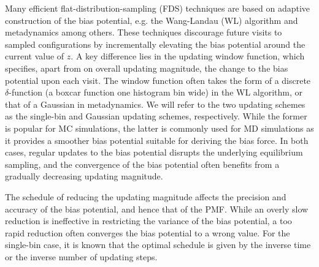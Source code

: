 \documentclass[preprint, superscriptaddress, floatfix]{revtex4-1}
\begin{document}
Many efficient flat-distribution-sampling (FDS) techniques
are based on adaptive construction of the bias potential,
e.g. the Wang-Landau (WL) algorithm\cite{
  wang2001, wang2001pre}
and metadynamics\cite{huber1994,
  *laio2002, *laio2008, *barducci2011, *sutto2012, micheletti2004}
among others\cite{yan2004, kim2006, *kim2007, kim2010, junghans2014,
  langfeld2012, pellegrini2014,
  maragliano2006, *abrams2008,
  zheng2010}.
%
These techniques
discourage future visits to sampled configurations
by incrementally elevating the bias potential
around the current value of $z$.
%
A key difference lies
in the updating window function,
which specifies,
apart from on overall updating magnitude,
the change to the bias potential upon each visit.
%
The window function often
takes the form of a discrete
$\delta$-function (a boxcar function one histogram bin wide)
in the WL algorithm,
or that of a Gaussian
in metadynamics.\cite{junghans2014}
%
We will refer to the two updating schemes
as the single-bin
and Gaussian updating schemes, respectively.
%
While the former is popular for MC simulations,\cite{wang2001,
  wang2001pre, kim2006, *kim2007}
the latter is commonly used for MD simulations
as it provides a smoother bias potential
suitable for deriving the bias force.\cite{huber1994,
  *laio2002, *laio2008, *barducci2011, *sutto2012, junghans2014}
%
In both cases,
regular updates to the bias potential
disrupts the underlying equilibrium
sampling,\cite{zhou2005, morozov2007, zhou2008}
and the convergence of the bias potential
often benefits from a gradually decreasing
updating magnitude.



The schedule of reducing the updating magnitude
affects the precision and accuracy
of the bias potential,
and hence that of the PMF.\cite{
belardinelli2007, *belardinelli2007jcp, *belardinelli2008, *belardinelli2016,
liang2007,
morozov2007, morozov2009, zhou2008,
komura2012, *caparica2012, *caparica2014,
min2007,
barducci2008, dickson2011, dama2014, poulain2006}
%
While an overly slow reduction
is ineffective in restricting the variance of the bias potential,
a too rapid reduction often
converges the bias potential to a wrong value.
%
For the single-bin case, it is known that
the optimal schedule is given by the
inverse time\cite{
belardinelli2007, *belardinelli2007jcp, *belardinelli2008, *belardinelli2016,
liang2007,
morozov2007, morozov2009, zhou2008}
or
the inverse number of updating steps.
\end{document}
